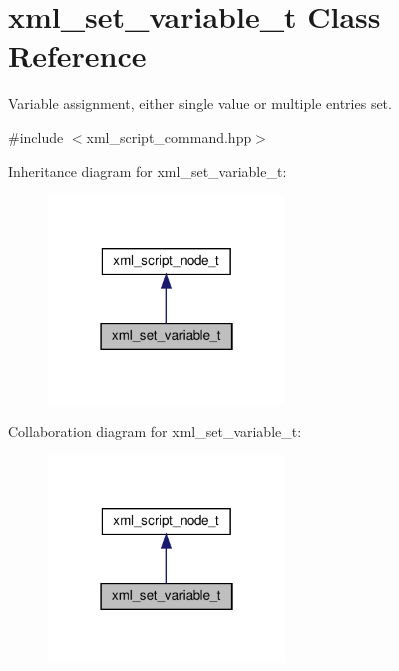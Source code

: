 \hypertarget{classxml__set__variable__t}{}\section{xml\+\_\+set\+\_\+variable\+\_\+t Class Reference}
\label{classxml__set__variable__t}


Variable assignment, either single value or multiple entries set.  




{\ttfamily \#include $<$xml\+\_\+script\+\_\+command.\+hpp$>$}



Inheritance diagram for xml\+\_\+set\+\_\+variable\+\_\+t\+:
\nopagebreak
\begin{figure}[H]
\begin{center}
\leavevmode
\includegraphics[width=178pt]{d4/d0f/classxml__set__variable__t__inherit__graph}
\end{center}
\end{figure}


Collaboration diagram for xml\+\_\+set\+\_\+variable\+\_\+t\+:
\nopagebreak
\begin{figure}[H]
\begin{center}
\leavevmode
\includegraphics[width=178pt]{df/ddc/classxml__set__variable__t__coll__graph}
\end{center}
\end{figure}
